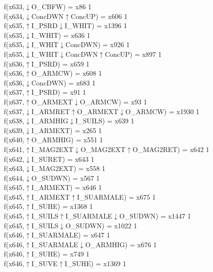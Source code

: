 f(x633,$\downarrow$O\_CBFW) = x86 {1} \\
f(x634,$\downarrow$ConcDWN$\uparrow$ConcUP) = x606 {1} \\
f(x635,$\uparrow$I\_PSRD$\downarrow$I\_WHIT) = x1396 {1} \\
f(x635,$\downarrow$I\_WHIT) = x636 {1} \\
f(x635,$\downarrow$I\_WHIT$\downarrow$ConcDWN) = x926 {1} \\
f(x635,$\downarrow$I\_WHIT$\downarrow$ConcDWN$\uparrow$ConcUP) = x897 {1} \\
f(x636,$\uparrow$I\_PSRD) = x659 {1} \\
f(x636,$\uparrow$O\_ARMCW) = x608 {1} \\
f(x636,$\downarrow$ConcDWN) = x683 {1} \\
f(x637,$\uparrow$I\_PSRD) = x91 {1} \\
f(x637,$\uparrow$O\_ARMEXT$\downarrow$O\_ARMCW) = x93 {1} \\
f(x637,$\downarrow$I\_ARMRET$\uparrow$O\_ARMEXT$\downarrow$O\_ARMCW) = x1930 {1} \\
f(x638,$\downarrow$I\_ARMHIG$\downarrow$I\_SUILS) = x639 {1} \\
f(x639,$\downarrow$I\_ARMEXT) = x265 {1} \\
f(x640,$\uparrow$O\_ARMHIG) = x551 {1} \\
f(x641,$\uparrow$I\_MAG2EXT$\downarrow$O\_MAG2EXT$\uparrow$O\_MAG2RET) = x642 {1} \\
f(x642,$\downarrow$I\_SURET) = x643 {1} \\
f(x643,$\downarrow$I\_MAG2EXT) = x558 {1} \\
f(x644,$\downarrow$O\_SUDWN) = x567 {1} \\
f(x645,$\uparrow$I\_ARMEXT) = x646 {1} \\
f(x645,$\uparrow$I\_ARMEXT$\uparrow$I\_SUARMALE) = x675 {1} \\
f(x645,$\uparrow$I\_SUHE) = x1368 {1} \\
f(x645,$\uparrow$I\_SUILS$\uparrow$I\_SUARMALE$\downarrow$O\_SUDWN) = x1447 {1} \\
f(x645,$\uparrow$I\_SUILS$\downarrow$O\_SUDWN) = x1022 {1} \\
f(x646,$\uparrow$I\_SUARMALE) = x647 {1} \\
f(x646,$\uparrow$I\_SUARMALE$\downarrow$O\_ARMHIG) = x676 {1} \\
f(x646,$\uparrow$I\_SUHE) = x749 {1} \\
f(x646,$\uparrow$I\_SUVE$\uparrow$I\_SUHE) = x1369 {1} \\

